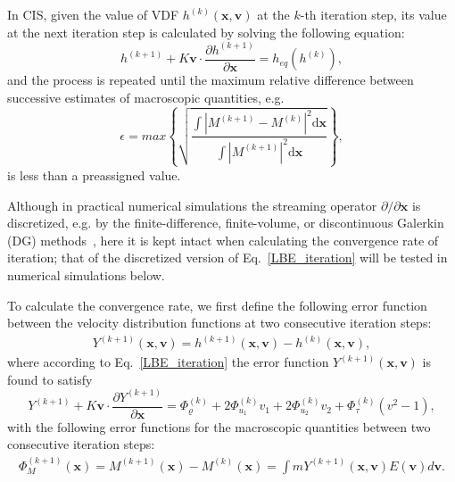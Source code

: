 In CIS, given the value of VDF $h^{(k)}(\bm{x},\bm{v})$ at the $k$-th iteration step, its value at the next iteration step is calculated by solving the following equation:
\begin{equation}\label{LBE_iteration}
h^{(k+1)}+
K\bm{v}\cdot\frac{\partial
	{h}^{(k+1)}}{\partial{\bm{x}}}=h_{eq}(h^{(k)}),
\end{equation}
and the process is repeated until the maximum relative difference between successive estimates of macroscopic quantities, e.g. 
\begin{equation}\label{general_epsilon}
\epsilon=max\left\{\sqrt{\frac{\int|M^{(k+1)}-M^{(k)}|^2\mathrm{d}\bm{x}}{\int|M^{(k+1)}|^2\mathrm{d}\bm{x}}}\right\},
\end{equation}
is less than a preassigned value.

Although in practical numerical simulations the streaming operator $\partial/\partial{\bm{x}}$ is discretized, e.g. by the finite-difference, finite-volume, or discontinuous Galerkin (DG) methods~\cite{WeiSuJCP1,Su2019IDG}, here it is kept intact when calculating the convergence rate of iteration; that of the discretized version of Eq.~\eqref{LBE_iteration} will be tested in numerical simulations below.  

To calculate the convergence rate, we first define the following error function between the velocity distribution functions at two consecutive iteration steps:
\begin{eqnarray}
Y^{(k+1)}(\bm{x},\bm{v})=h^{(k+1)}(\bm{x},\bm{v})-h^{(k)}(\bm{x},\bm{v}), \label{Y_expression}
\end{eqnarray}
where according to Eq.~\eqref{LBE_iteration} the error function $Y^{(k+1)}(\bm{x},\bm{v})$ is found to satisfy
\begin{equation}\label{LBE_iteration2}
Y^{(k+1)}+
K\bm{v}\cdot\frac{\partial
	{Y}^{(k+1)}}{\partial{\bm{x}}}=\Phi_\varrho^{(k)}+2\Phi_{u_1}^{(k)}v_1+2\Phi_{u_2}^{(k)}v_2+\Phi_\tau^{(k)}\left(v^2-1\right),
\end{equation}
with the following error functions for the macroscopic quantities between two consecutive iteration steps: 
\begin{eqnarray}
\Phi^{(k+1)}_M(\bm{x})=M^{(k+1)}(\bm{x})-M^{(k)}(\bm{x})={\int{}mY^{(k+1)}(\bm{x},\bm{v})E(\bm{v})d\bm{v}}. \label{Phi_expression}
\end{eqnarray}


